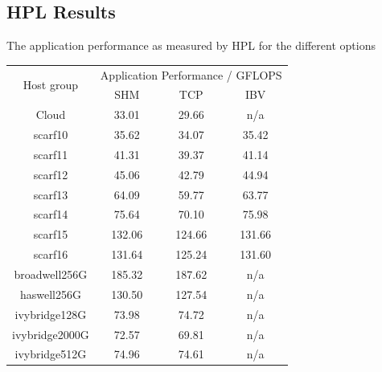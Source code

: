 \documentclass{article}
\begin{document}
    \subsection{HPL Results}
        \label{appendix:hpl-data}
        \begin{center}
            \centering
            \captionsetup{type=table}
            \caption{The application performance as measured by HPL for the different options}
            \begin{tabular}{ |c||c|c|c|  }
             \hline
             \multirow{2}{*}{Host group} & \multicolumn{3}{c|}{Application Performance / GFLOPS} \\
             \cline{2-4}
                                      & SHM & TCP & IBV\\
             \hline
                  Cloud & 33.01 & 29.66 & n/a\\
                  scarf10 & 35.62 & 34.07 & 35.42\\
                  scarf11 & 41.31 & 39.37 & 41.14\\
                  scarf12 & 45.06 & 42.79 & 44.94\\
                  scarf13 & 64.09 & 59.77 & 63.77\\
                  scarf14 & 75.64 & 70.10 & 75.98\\
                  scarf15 & 132.06 & 124.66 & 131.66\\
                  scarf16 & 131.64 & 125.24 & 131.60\\
                  broadwell256G & 185.32 & 187.62 & n/a\\
                  haswell256G & 130.50 & 127.54 & n/a\\
                  ivybridge128G & 73.98 & 74.72 & n/a\\
                  ivybridge2000G & 72.57 & 69.81 & n/a\\
                  ivybridge512G & 74.96 & 74.61 & n/a\\
             \hline
            \end{tabular}

        \end{center}
\end{document}
